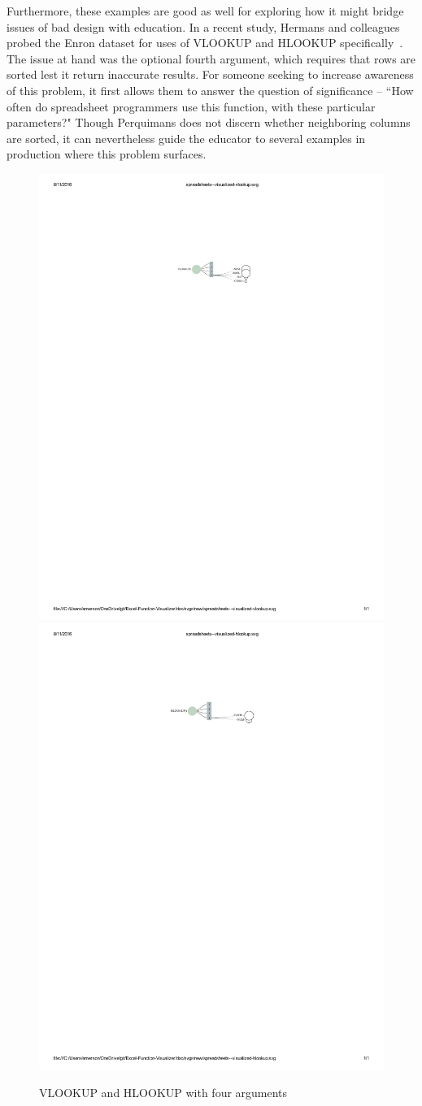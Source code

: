 \documentclass[conference]{IEEEtran}
\newcommand{\toolname}{Perquimans\xspace} \newcommand{\toolnameend}{Perquimans}
\begin{document}
	Furthermore, these examples are good as well for exploring how it might bridge
	issues of bad design with education. In a recent study, Hermans and colleagues
	probed the Enron dataset for uses of VLOOKUP and HLOOKUP
	specifically~\cite{hermans2015detecting}. The issue at hand was the optional
	fourth argument, which requires that rows are sorted lest it return inaccurate
	results. For someone seeking to increase awareness of this problem, it first
	allows them to answer the question of significance -- ``How often do
	spreadsheet programmers use this function, with these particular parameters?"
	Though \toolname does not discern whether neighboring columns are sorted, it
	can nevertheless guide the educator to several examples in production where
	this problem surfaces. \par
	
	\begin{figure}[h] \centering \includegraphics[width=.5\textwidth]{vlookup}
		\includegraphics[width=.5\textwidth]{hlookup} \caption{VLOOKUP and HLOOKUP with
			four arguments} \label{fig:vhlookups}\end{figure}
	
\end{document}
